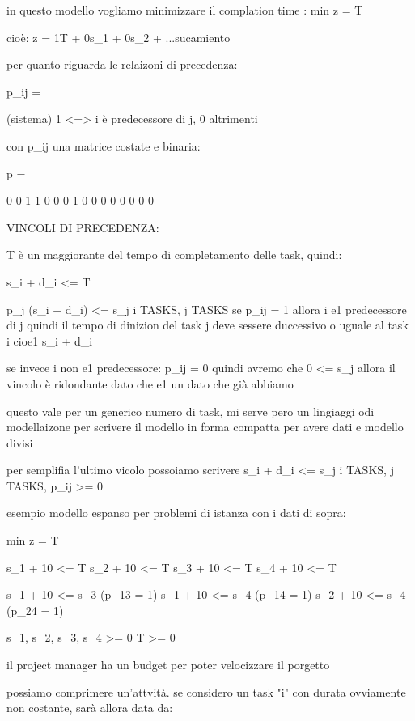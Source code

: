 in questo modello vogliamo minimizzare il complation time : min z = T

cioè: z = 1T + 0s_1 + 0s_2 + ...sucamiento


per quanto riguarda le relaizoni di precedenza:

p_{ij} = { (sistema) 1 <=> i è predecessore di j, 0 altrimenti

con p_{ij} una matrice costate e binaria:

p = 

0 0 1 1
0 0 0 1
0 0 0 0
0 0 0 0




VINCOLI DI PRECEDENZA:

T è un maggiorante del tempo di completamento delle task, quindi:

s_i + d_i <= T

p_j (s_i + d_i) <= s_j \forall i \in TASKS, j \in TASKS
se p_ij = 1 allora i e1 predecessore di j quindi il tempo di dinizion del task j deve sessere duccessivo o uguale al task i cioe1 s_i + d_i


se invece i non e1 predecessore: p_ij = 0 quindi avremo che 0 <= s_j allora il vincolo è ridondante dato che e1 un dato che già abbiamo


questo vale per un generico numero di task, mi serve pero un lingiaggi odi modellaizone per scrivere il modello in forma compatta per avere dati e modello divisi


per semplifia l'ultimo vicolo possoiamo scrivere 
s_i + d_i <= s_j \forall i \in TASKS, j \in TASKS, p_{ij} >= 0





esempio modello espanso per problemi di istanza con i dati di sopra:

min z = T

s_1 + 10 <= T
s_2 + 10 <= T
s_3 + 10 <= T
s_4 + 10 <= T

s_1 + 10 <= s_3 (p_{13} = 1)
s_1 + 10 <= s_4 (p_{14} = 1)
s_2 + 10 <= s_4 (p_{24} = 1)

s_1, s_2, s_3, s_4 >= 0
T >= 0










il project manager ha un budget per poter velocizzare il porgetto

possiamo comprimere un'attvità. se considero un task "i" con durata ovviamente non costante, sarà allora data da:

}
